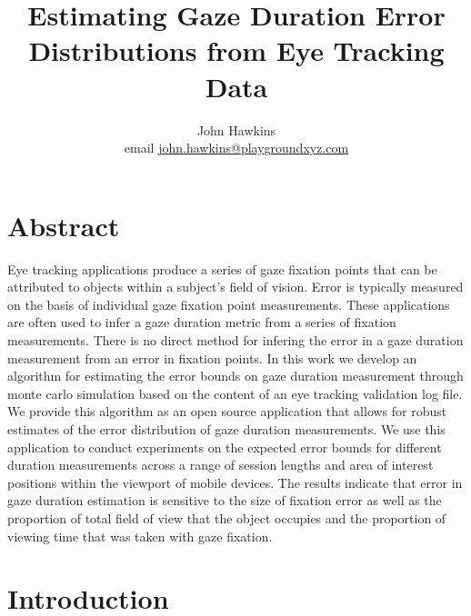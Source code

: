 \documentclass[12pt,a4paper]{article}
\numberwithin{equation}{section}
\begin{document}
 
\title{Estimating Gaze Duration Error Distributions from Eye Tracking Data}

\author{
John Hawkins \\ email \href{mailto:john.hawkins@playgroundxyz.com}{john.hawkins@playgroundxyz.com} \\
} 

\maketitle

\section{Abstract}

Eye tracking applications produce a series of gaze fixation points that can be attributed to
objects within a subject's field of vision. Error is typically measured on the basis of individual
gaze fixation point measurements. These applications are often used to infer a gaze duration
metric from a series of fixation measurements. There is no direct method for infering the error in
a gaze duration measurement from an error in fixation points. 
In this work we develop an algorithm for estimating
the error bounds on gaze duration measurement through monte carlo simulation based on the content
of an eye tracking validation log file. We provide this algorithm as an open source application
that allows for robust estimates of the error distribution of gaze duration measurements. 
We use this application to conduct experiments on the expected error bounds for different duration
measurements across a range of session lengths and area of interest positions within the viewport
of mobile devices. The results indicate that error in gaze duration estimation is sensitive to
the size of fixation error as well as the proportion of total field of view that the object occupies
and the proportion of viewing time that was taken with gaze fixation.


\section{Introduction}
\end{document}
